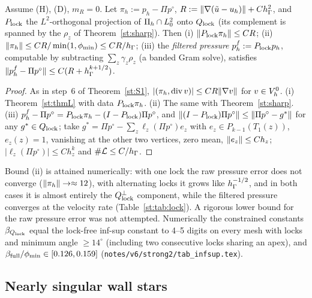 \begin{theorem}\label{st:P}
Assume (H), (D), $m_R=0$. Let $\pi_h:=p_h-\Pi p^\circ$, $R:=\lVert \nabla(\tilde u-u_h)\rVert+Ch_\Gamma^2$, and $P_{\rm lock}$ the $L^2$-orthogonal projection of $\Pi_h\cap L^2_0$ onto $Q_{\mathrm{lock}}$ (its complement is spanned by the $\rho_z$ of Theorem~\ref{st:sharp}). Then (i) $\lVert P_{\rm lock}\pi_h\rVert\le CR$; (ii) $\lVert \pi_h\rVert\le CR/\min(1,\phi_{\min})\le CR/h_\Gamma$; (iii) the \emph{filtered pressure} $p_h^f:=P_{\rm lock}p_h$, computable by subtracting $\sum_z\gamma_z\rho_z$ (a banded Gram solve), satisfies $\lVert p_h^f-\Pi p^\circ\rVert\le C(R+h_\Gamma^{k+1/2})$.
\end{theorem}

\begin{proof}
As in step~6 of Theorem~\ref{st:S1}, $|(\pi_h,\operatorname{div} v)|\le CR\lVert \nabla v\rVert$ for $v\in V_h^0$. (i) Theorem~\ref{st:thmL} with data $P_{\rm lock}\pi_h$. (ii) The same with Theorem~\ref{st:sharp}. (iii) $p_h^f-\Pi p^\circ=P_{\rm lock}\pi_h-(I-P_{\rm lock})\Pi p^\circ$, and $\lVert (I-P_{\rm lock})\Pi p^\circ\rVert\le\lVert \Pi p^\circ-g^\ast\rVert$ for any $g^\ast\in Q_{\mathrm{lock}}$; take $g^\ast=\Pi p^\circ-\sum_z\ell_z(\Pi p^\circ)e_z$ with $e_z\in P_{k-1}(T_1(z))$, $e_z(z)=1$, vanishing at the other two vertices, zero mean, $\lVert e_z\rVert\le Ch_z$; $|\ell_z(\Pi p^\circ)|\le Ch_z^k$ and $\#\mathcal L\le C/h_\Gamma$.
\end{proof}

Bound (ii) is attained numerically: with one lock the raw pressure error does not converge ($\lVert \pi_h\rVert\to\approx12$), with alternating locks it grows like $h_\Gamma^{-1/2}$, and in both cases it is almost entirely the $Q_{\mathrm{lock}}^\perp$ component, while the filtered pressure converges at the velocity rate (Table~\ref{st:tab:lock}). A rigorous lower bound for the raw pressure error was not attempted. Numerically the constrained constants $\beta_{Q_{\mathrm{lock}}}$ equal the lock-free inf-sup constant to 4--5 digits on every mesh with locks and minimum angle $\ge14^\circ$ (including two consecutive locks sharing an apex), and $\beta_{\rm full}/\phi_{\min}\in[0.126,0.159]$ (\texttt{notes/v6/strong2/tab\_infsup.tex}).

\subsection{Nearly singular wall stars}\label{st:sec:ns}

